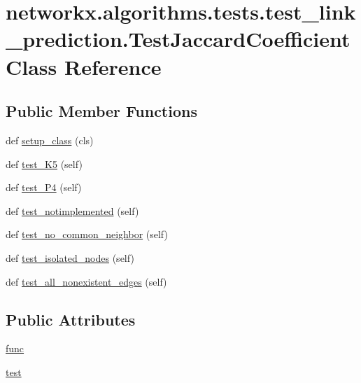 \hypertarget{classnetworkx_1_1algorithms_1_1tests_1_1test__link__prediction_1_1TestJaccardCoefficient}{}\section{networkx.\+algorithms.\+tests.\+test\+\_\+link\+\_\+prediction.\+Test\+Jaccard\+Coefficient Class Reference}
\label{classnetworkx_1_1algorithms_1_1tests_1_1test__link__prediction_1_1TestJaccardCoefficient}
\subsection*{Public Member Functions}
\begin{DoxyCompactItemize}
\item 
def \hyperlink{classnetworkx_1_1algorithms_1_1tests_1_1test__link__prediction_1_1TestJaccardCoefficient_aacad942708264e377897c1fc3ea8493c}{setup\+\_\+class} (cls)
\item 
def \hyperlink{classnetworkx_1_1algorithms_1_1tests_1_1test__link__prediction_1_1TestJaccardCoefficient_a530c7026083de505bc4926b2e11ca031}{test\+\_\+\+K5} (self)
\item 
def \hyperlink{classnetworkx_1_1algorithms_1_1tests_1_1test__link__prediction_1_1TestJaccardCoefficient_a6ff95b24c33a3b9f4919b7c41c642879}{test\+\_\+\+P4} (self)
\item 
def \hyperlink{classnetworkx_1_1algorithms_1_1tests_1_1test__link__prediction_1_1TestJaccardCoefficient_a7e9715a28651f89ad3601c39bbc18eca}{test\+\_\+notimplemented} (self)
\item 
def \hyperlink{classnetworkx_1_1algorithms_1_1tests_1_1test__link__prediction_1_1TestJaccardCoefficient_a4f9c2c9f65b9ecd4f5c27d79a09ad507}{test\+\_\+no\+\_\+common\+\_\+neighbor} (self)
\item 
def \hyperlink{classnetworkx_1_1algorithms_1_1tests_1_1test__link__prediction_1_1TestJaccardCoefficient_acfc4200d1ecfafe80de18cf4817828f8}{test\+\_\+isolated\+\_\+nodes} (self)
\item 
def \hyperlink{classnetworkx_1_1algorithms_1_1tests_1_1test__link__prediction_1_1TestJaccardCoefficient_a6ccd9b5a5de343327999113ec43ca4ce}{test\+\_\+all\+\_\+nonexistent\+\_\+edges} (self)
\end{DoxyCompactItemize}
\subsection*{Public Attributes}
\begin{DoxyCompactItemize}
\item 
\hyperlink{classnetworkx_1_1algorithms_1_1tests_1_1test__link__prediction_1_1TestJaccardCoefficient_a1c92cf052ac1722df5c9e97523755620}{func}
\item 
\hyperlink{classnetworkx_1_1algorithms_1_1tests_1_1test__link__prediction_1_1TestJaccardCoefficient_adc2fee2db873b09f7fd2cc1b34998861}{test}
\end{DoxyCompactItemize}



